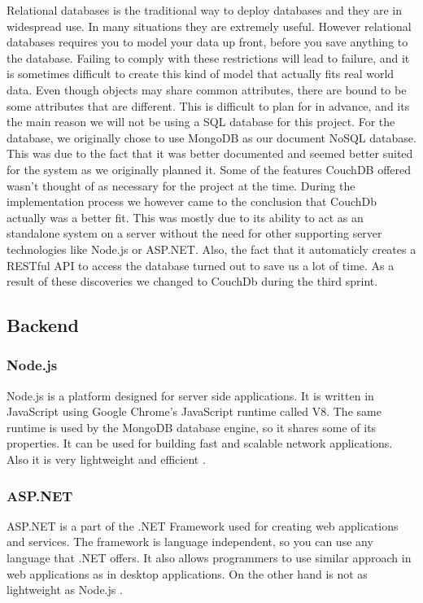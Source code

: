 Relational databases is the traditional way to deploy databases and they are in widespread use. In many situations they are extremely useful. However relational databases requires you to model your data up front, before you save anything to the database. Failing to comply with these restrictions will lead to failure, and it is sometimes difficult to create this kind of model that actually fits real world data. Even though objects may share common attributes, there are bound to be some attributes that are different. This is difficult to plan for in advance, and its the main reason we will not be using a SQL database for this project. For the database, we originally chose to use MongoDB as our document NoSQL database. This was due to the fact that it was better documented and seemed better suited for the system as we originally planned it. Some of the features CouchDB offered wasn't thought of as necessary for the project at the time. During the implementation process we however came to the conclusion that CouchDb actually was a better fit. This was mostly due to its ability to act as an standalone system on a server without the need for other supporting server technologies like Node.js or ASP.NET. Also, the fact that it automaticly creates a RESTful API to access the database turned out to save us a lot of time. As a result of these discoveries we changed to CouchDb during the third sprint.


\subsection{Backend}
\subsubsection*{Node.js}
Node.js is a platform designed for server side applications. It is written in JavaScript using Google Chrome's JavaScript runtime called V8. The same runtime is used by the MongoDB database engine, so it shares some of its properties. It can be used for building fast and scalable network applications. Also it is very lightweight and efficient \cite{nodejs-about}.

\subsubsection*{ASP.NET}
ASP.NET is a part of the .NET Framework used for creating web applications and services. The framework is language independent, so you can use any language that .NET offers. It also allows programmers to use similar approach in web applications as in desktop applications. On the other hand is not as lightweight as Node.js \cite{aspnet-about}.

